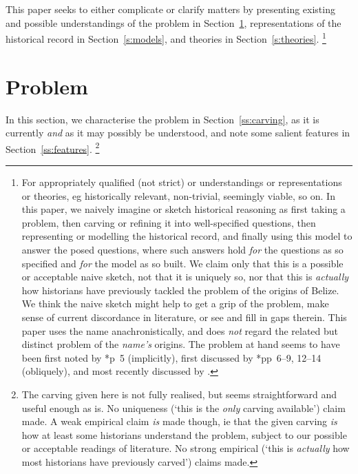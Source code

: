 	This paper seeks to either complicate or clarify matters by presenting existing and possible understandings of the problem in Section~\ref{s:problem}, representations of the historical record in Section~\ref{s:models}, and theories in Section~\ref{s:theories}.%
	\footnote{For appropriately qualified (not strict)  or  understandings or representations or theories, eg historically relevant, non-trivial, seemingly viable, so on. In this paper, we naively imagine or sketch historical reasoning as first taking a problem, then carving or refining it into well-specified questions, then representing or modelling the historical record, and finally using this model to answer the posed questions, where such answers hold \emph{for} the questions as so specified and \emph{for} the model as so built. We claim only that this is a possible or acceptable naive sketch, not that it is uniquely so, nor that this is \emph{actually} how historians have previously tackled the problem of the origins of Belize. We think the naive sketch might help to get a grip of the problem, make sense of current discordance in literature, or see and fill in gaps therein. This paper uses the name  anachronistically, and does \emph{not} regard the related but distinct problem of the \emph{name's} origins. The problem at hand seems to have been first noted by \cite{alm26}*{p~5} (implicitly), first discussed by \cite{nun77}*{pp~6--9, 12--14} (obliquely), and most recently discussed by .} %
%
%
%
%
\section{Problem}
\label{s:problem}
	In this section, we characterise the problem in Section~\ref{ss:carving}, as it is currently \emph{and} as it may possibly be understood, and note some salient features in Section~\ref{ss:features}.%
	\footnote{The carving given here is not fully realised, but seems straightforward and useful enough as is. No uniqueness (`this is the \emph{only} carving available') claim made. A weak empirical claim \emph{is} made though, ie that the given carving \emph{is} how at least some historians understand the problem, subject to our possible or acceptable readings of literature. No strong empirical (`this is \emph{actually} how most historians have previously carved') claims made.}
